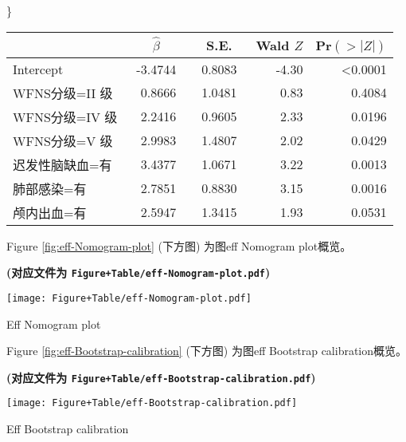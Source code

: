 \documentclass[
]{article}
\begin{document}
\}

\setlongtables

\begin{longtable}{lrrrr}\hline
\multicolumn{1}{l}{}&\multicolumn{1}{c}{$\hat{\beta}$}&\multicolumn{1}{c}{S.E.}&\multicolumn{1}{c}{Wald $Z$}&\multicolumn{1}{c}{Pr$(>|Z|)$}\tabularnewline
\hline
\endhead
\hline
\endfoot
Intercept&~-3.4744~&~0.8083~&-4.30&\textless 0.0001\tabularnewline
WFNS分级=II 级&~ 0.8666~&~1.0481~& 0.83&0.4084\tabularnewline
WFNS分级=IV 级&~ 2.2416~&~0.9605~& 2.33&0.0196\tabularnewline
WFNS分级=V 级&~ 2.9983~&~1.4807~& 2.02&0.0429\tabularnewline
迟发性脑缺血=有&~ 3.4377~&~1.0671~& 3.22&0.0013\tabularnewline
肺部感染=有&~ 2.7851~&~0.8830~& 3.15&0.0016\tabularnewline
颅内出血=有&~ 2.5947~&~1.3415~& 1.93&0.0531\tabularnewline
\hline
\end{longtable}
\addtocounter{table}{-1}

Figure \ref{fig:eff-Nomogram-plot} (下方图) 为图eff Nomogram plot概览。

\textbf{(对应文件为 \texttt{Figure+Table/eff-Nomogram-plot.pdf})}

\def\@captype{figure}
\begin{center}
\texttt{[image: Figure+Table/eff-Nomogram-plot.pdf]}
\caption{Eff Nomogram plot}\label{fig:eff-Nomogram-plot}
\end{center}

Figure \ref{fig:eff-Bootstrap-calibration} (下方图) 为图eff Bootstrap calibration概览。

\textbf{(对应文件为 \texttt{Figure+Table/eff-Bootstrap-calibration.pdf})}

\def\@captype{figure}
\begin{center}
\texttt{[image: Figure+Table/eff-Bootstrap-calibration.pdf]}
\caption{Eff Bootstrap calibration}\label{fig:eff-Bootstrap-calibration}
\end{center}
\end{document}
